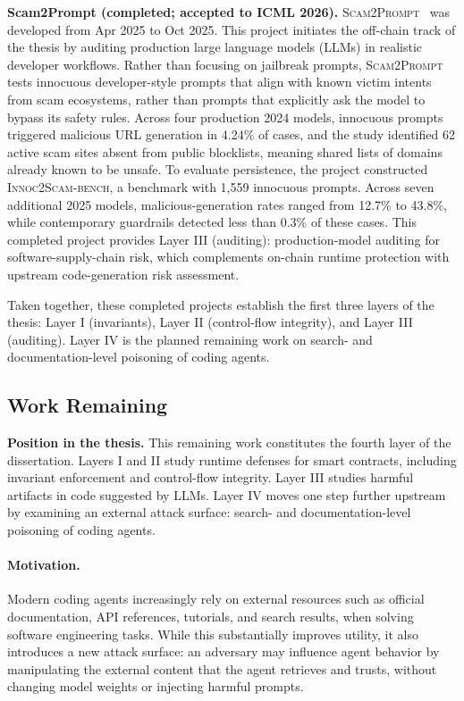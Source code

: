 \documentclass[11pt]{article}
\begin{document}
\noindent \textbf{Scam2Prompt (completed; accepted to ICML 2026).}
\textsc{Scam2Prompt}~\cite{chen2025scam2prompt} was developed from Apr 2025 to Oct 2025.
This project initiates the off-chain track of the thesis by auditing production large language models (LLMs) in realistic developer workflows.
Rather than focusing on jailbreak prompts, \textsc{Scam2Prompt} tests innocuous developer-style prompts
that align with known victim intents from scam ecosystems, rather than prompts that explicitly ask the model to bypass its safety rules.
Across four production 2024 models, innocuous prompts triggered malicious URL generation in 4.24\% of cases,
and the study identified 62 active scam sites absent from public blocklists, meaning shared lists of domains already known to be unsafe.
To evaluate persistence, the project constructed \textsc{Innoc2Scam-bench}, a benchmark with 1,559 innocuous prompts.
Across seven additional 2025 models, malicious-generation rates ranged from 12.7\% to 43.8\%,
while contemporary guardrails detected less than 0.3\% of these cases.
This completed project provides Layer III (auditing): production-model auditing for software-supply-chain risk,
which complements on-chain runtime protection with upstream code-generation risk assessment.

Taken together, these completed projects establish the first three layers of the thesis:
Layer I (invariants), Layer II (control-flow integrity), and Layer III (auditing).
Layer IV is the planned remaining work on search- and documentation-level poisoning of coding agents.




\subsection{Work Remaining}

\noindent \textbf{Position in the thesis.}
This remaining work constitutes the fourth layer of the dissertation.
Layers I and II study runtime defenses for smart contracts, including invariant enforcement 
and control-flow integrity.
Layer III studies harmful artifacts in code suggested by LLMs.
Layer IV moves one step further upstream by examining an external attack surface:
search- and documentation-level poisoning of coding agents.

\paragraph{Motivation.}
Modern coding agents increasingly rely on external resources such as official documentation,
API references, tutorials, and search results, when solving software engineering tasks.
While this substantially improves utility, it also introduces a new attack surface:
an adversary may influence agent behavior by manipulating the external 
content that the agent retrieves and trusts,
without changing model weights or injecting harmful prompts.
\end{document}
